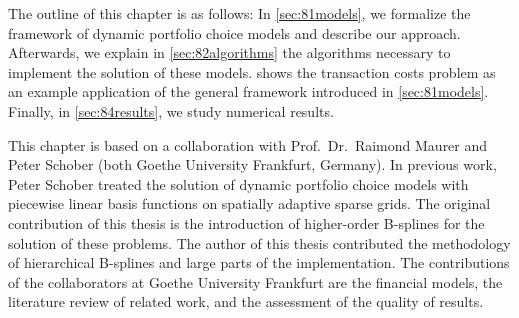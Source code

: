 The outline of this chapter is as follows:
In \cref{sec:81models}, we formalize the framework of
dynamic portfolio choice models and describe our approach.
Afterwards, we explain in \cref{sec:82algorithms} the algorithms
necessary to implement the solution of these models.
 shows the transaction costs problem
as an example application of the general framework introduced
in \cref{sec:81models}.
Finally, in \cref{sec:84results}, we study numerical results.

This chapter is based on a collaboration with Prof.\ Dr.\ Raimond Maurer
and Peter Schober (both Goethe University Frankfurt, Germany).
In previous work, Peter Schober treated the solution of
dynamic portfolio choice models with piecewise linear basis functions
on spatially adaptive sparse grids.
The original contribution of this thesis is the introduction
of higher-order B-splines for the solution of these problems.
The author of this thesis contributed the methodology of
hierarchical B-splines and large parts of the implementation.
The contributions of the collaborators at Goethe University Frankfurt
are the financial models, the literature review of related work,
and the assessment of the quality of results.






\cleardoublepage
